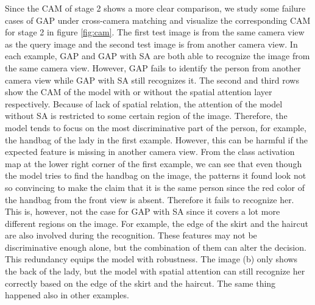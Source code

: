 \documentclass[10pt,twocolumn,letterpaper]{article}
\begin{document}
Since the CAM of stage 2 shows a more clear comparison, we study some failure cases of GAP under cross-camera matching and visualize the corresponding CAM for stage 2 in figure \ref{fig:cam}.
The first test image is from the same camera view as the query image and the second test image is from another camera view. In each example, GAP and GAP with SA are both able to recognize the image from the same camera view. However, GAP fails to identify the person from another camera view while GAP with SA still recognizes it. The second and third rows show the CAM of the model with or without the spatial attention layer respectively. Because of lack of spatial relation, the attention of the model without SA is restricted to some certain region of the image. Therefore, the model tends to focus on the most discriminative part of the person, for example, the handbag of the lady in the first example. However, this can be harmful if the expected feature is missing in another camera view. From the class activation map at the lower right corner of the first example, we can see that even though the model tries to find the handbag on the image, the patterns it found look not so convincing to make the claim that it is the same person since the red color of the handbag from the front view is absent. Therefore it fails to recognize her.
This is, however, not the case for GAP with SA since it covers a lot more different regions on the image. For example, the edge of the skirt and the haircut are also involved during the recognition. These features may not be discriminative enough alone, but the combination of them can alter the decision. This redundancy equips the model with robustness. The image (b) only shows the back of the lady, but the model with spatial attention can still recognize her correctly based on the edge of the skirt and the haircut. The same thing happened also in other examples.
\end{document}

